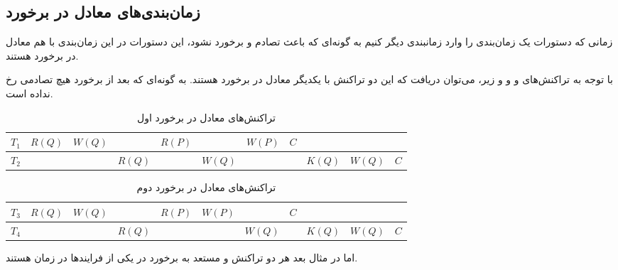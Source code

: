 \documentclass[20pt, a4paper]{article}
\begin{document}
\subsection{زمان‌بندی‌های معادل در برخورد}

زمانی که دستورات یک زمان‌بندی را وارد زمانبندی دیگر کنیم به گونه‌ای که باعث تصادم
و برخورد نشود، این دستورات در این زمان‌بندی با هم معادل در برخورد هستند.

با توجه به تراکنش‌های  و  و  و 
زیر، می‌توان دریافت که این دو تراکنش با یکدیگر معادل در برخورد هستند. به گونه‌ای
که بعد از برخورد هیچ تصادمی رخ نداده است.

\begin{LTR}
    \begin{table}[h]
        \centering
        \begin{RTL}
            \caption{تراکنش‌های معادل در برخورد اول}
        \end{RTL}
        \begin{tabular}{|c|c|c|c|c|c|c|c|c|c|c|}
            \hline
            $T_{1}$ & $R(Q)$ & $W(Q)$ & & $R(P)$ & & $W(P)$ & $C$ & & & \\ \hline
            $T_{2}$ & & & $R(Q)$ & & $W(Q)$ & &  & $K(Q)$ & $W(Q)$ & $C$ \\ \hline
        \end{tabular}
    \end{table}
\end{LTR}

\begin{LTR}
    \begin{table}[h]
        \centering
        \begin{RTL}
            \caption{تراکنش‌های معادل در برخورد دوم}
        \end{RTL}
        \begin{tabular}{|c|c|c|c|c|c|c|c|c|c|c|}
            \hline
            $T_{3}$ & $R(Q)$ & $W(Q)$ & & $R(P)$ & $W(P)$ & & $C$ & & & \\ \hline
            $T_{4}$ & & & $R(Q)$ & & & $W(Q)$ &  & $K(Q)$ & $W(Q)$ & $C$ \\ \hline
        \end{tabular}
    \end{table}
\end{LTR}

\newpage

اما در مثال بعد هر دو تراکنش  و  مستعد به برخورد در یکی
از فرایند‌ها در زمان هستند.
\end{document}
